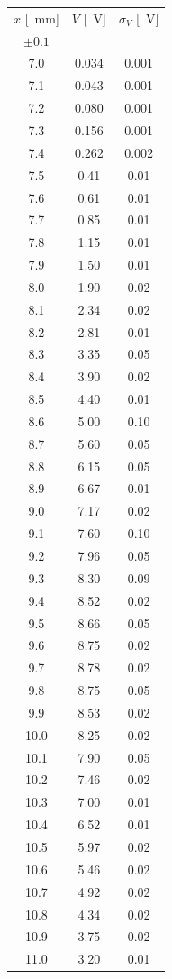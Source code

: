 \documentclass[10pt,oneside,a4paper]{article}
\begin{document}
\begin{minipage}[t]{0.33\linewidth}
\vspace{0cm}
\begin{center}
\begin{tabular}{c|c|c}
$x$ [\SI{}{mm}] & $V$ [\SI{}{V}] & $\sigma_V$ [\SI{}{V}] \\
 $\pm 0.1$ & & \\
\hline
  7.0 & 0.034 & 0.001 \\
  7.1 & 0.043 & 0.001 \\
  7.2 & 0.080 & 0.001 \\
  7.3 & 0.156 & 0.001 \\
  7.4 & 0.262 & 0.002 \\
  7.5 & 0.41 & 0.01 \\
  7.6 & 0.61 & 0.01 \\
  7.7 & 0.85 & 0.01 \\
  7.8 & 1.15 & 0.01 \\
  7.9 & 1.50 & 0.01 \\
  8.0 & 1.90 & 0.02 \\
  8.1 & 2.34 & 0.02 \\
  8.2 & 2.81 & 0.01 \\
  8.3 & 3.35 & 0.05 \\
  8.4 & 3.90 & 0.02 \\
  8.5 & 4.40 & 0.01 \\
 8.6 & 5.00 & 0.10 \\
  8.7 & 5.60 & 0.05 \\
  8.8 & 6.15 & 0.05 \\
  8.9 & 6.67 & 0.01 \\
  9.0 & 7.17 & 0.02 \\
  9.1 & 7.60 & 0.10 \\
  9.2 & 7.96 & 0.05 \\
  9.3 & 8.30 & 0.09 \\
  9.4 & 8.52 & 0.02 \\
  9.5 & 8.66 & 0.05 \\
  9.6 & 8.75 & 0.02 \\
  9.7 & 8.78 & 0.02 \\
  9.8 & 8.75 & 0.05 \\
  9.9 & 8.53 & 0.02 \\
 10.0 & 8.25 & 0.02 \\
 10.1 & 7.90 & 0.05 \\
 10.2 & 7.46 & 0.02 \\
 10.3 & 7.00 & 0.01 \\
 10.4 & 6.52 & 0.01 \\
 10.5 & 5.97 & 0.02 \\
 10.6 & 5.46 & 0.02 \\
 10.7 & 4.92 & 0.02 \\
 10.8 & 4.34 & 0.02 \\
 10.9 & 3.75 & 0.02 \\
 11.0 & 3.20 & 0.01 \\
\hline
\end{tabular}
\end{center}
\end{minipage}
\end{document}
